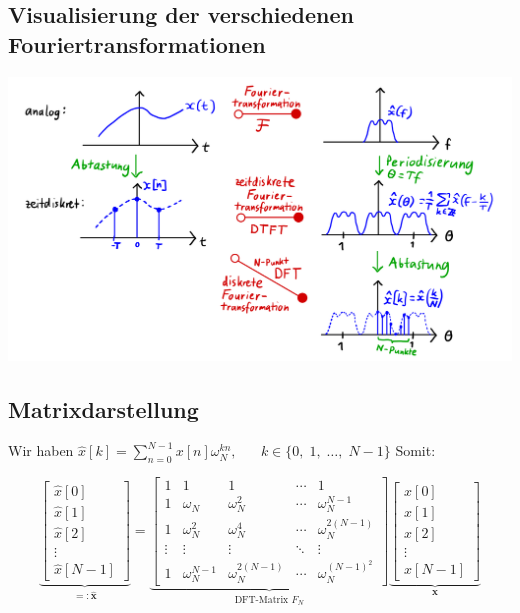 \documentclass[11pt]{article}
\begin{document}
\vfill \null
\pagebreak

\subsection*{Visualisierung der verschiedenen Fouriertransformationen}
\vspace*{-0.5cm}
\begin{center}
    \includegraphics[width=0.8\linewidth]{docimgs/DFT_visuals.jpeg}
\end{center}

\vspace*{-0.5cm}
\subsection*{Matrixdarstellung}
\vspace*{-0.5cm}
Wir haben $\hat{x}[k] = \displaystyle\sum_{n=0}^{N-1} x[n]\omega_N^{kn}, \hspace{20pt} k \in \{ 0, \; 1, \; \dots, \; N-1 \}$ Somit:

$$\underbrace{\begin{bmatrix}
    \hat{x}[0] \\
    \hat{x}[1] \\
    \hat{x}[2] \\
    \vdots \\
    \hat{x}[N-1]
\end{bmatrix}}_{=: \hat{\mathbf{x}}} = \underbrace{\begin{bmatrix}
    1 & 1 & 1 & \cdots & 1 \\
    1 & \omega_N & \omega_N^2 & \cdots & \omega_N^{N-1} \\
    1 & \omega_N^2 & \omega_N^4 & \cdots & \omega_N^{2(N-1)} \\
    \vdots & \vdots & \vdots & \ddots & \vdots \\
    1 & \omega_N^{N-1} & \omega_N^{2(N-1)} & \cdots & \omega_N^{(N-1)^2}
\end{bmatrix}}_{\text{DFT-Matrix } F_N} \underbrace{\begin{bmatrix}
    x[0] \\
    x[1] \\
    x[2] \\
    \vdots \\
    x[N-1]
\end{bmatrix}}_{\mathbf{x}}$$
\end{document}
